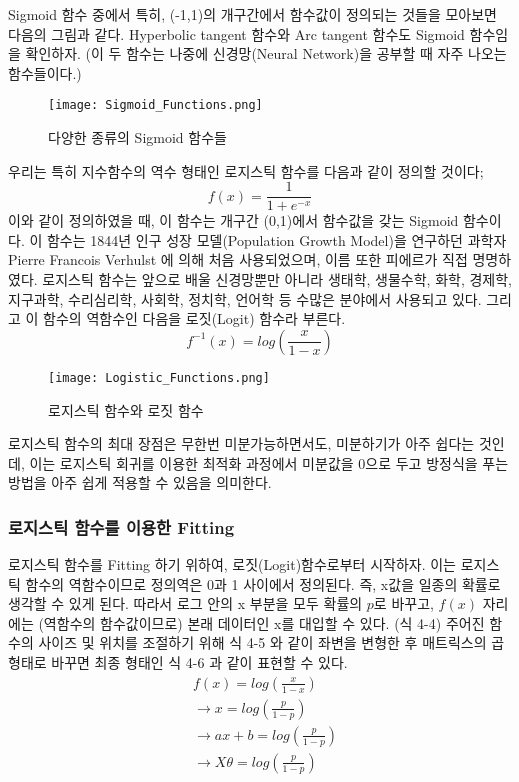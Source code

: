\documentclass[a4paper]{oblivoir}
\begin{document}
\indent Sigmoid 함수 중에서 특히, (-1,1)의 개구간에서 함수값이 정의되는 것들을 모아보면 다음의 그림과 같다. Hyperbolic tangent 함수와 Arc tangent 함수도 Sigmoid 함수임을 확인하자. (이 두 함수는 나중에 신경망(Neural Network)을 공부할 때 자주 나오는 함수들이다.)
\begin{figure}[ht]
\centering
\texttt{[image: Sigmoid\_Functions.png]}
\caption{다양한 종류의 Sigmoid 함수들}
\label{Figure 4-6}
\end{figure}

\indent 우리는 특히 지수함수의 역수 형태인 로지스틱 함수를 다음과 같이 정의할 것이다;
\begin{equation*}f(x) = \frac{1}{1+e^{-x}} \tag{4-1}\end{equation*} 이와 같이 정의하였을 때, 이 함수는 개구간 (0,1)에서 함수값을 갖는 Sigmoid 함수이다. 이 함수는 1844년 인구 성장 모델(Population Growth Model)을 연구하던 과학자 Pierre Francois Verhulst 에 의해 처음 사용되었으며, 이름 또한 피에르가 직접 명명하였다.  로지스틱 함수는 앞으로 배울 신경망뿐만 아니라 생태학, 생물수학, 화학, 경제학, 지구과학, 수리심리학, 사회학, 정치학, 언어학 등 수많은 분야에서 사용되고 있다. 그리고 이 함수의 역함수인 다음을 로짓(Logit) 함수라 부른다. \begin{equation*}f^{-1}(x) = log(\frac{x}{1-x}) \tag{4-2}\end{equation*}
\begin{figure}[ht]
\centering
\texttt{[image: Logistic\_Functions.png]}
\caption{로지스틱 함수와 로짓 함수}
\label{Figure 4-7}
\end{figure}

\indent 로지스틱 함수의 최대 장점은 무한번 미분가능하면서도, 미분하기가 아주 쉽다는 것인데,  이는 로지스틱 회귀를 이용한 최적화 과정에서 미분값을 0으로 두고 방정식을 푸는 방법을 아주 쉽게 적용할 수 있음을 의미한다. 

\subsubsection{로지스틱 함수를 이용한 Fitting}
로지스틱 함수를 Fitting 하기 위하여, 로짓(Logit)함수로부터 시작하자. 이는 로지스틱 함수의 역함수이므로 정의역은 0과 1 사이에서 정의된다. 즉, x값을 일종의 확률로 생각할 수 있게 된다. 따라서 로그 안의 x 부분을 모두 확률의 $p$로 바꾸고, $f(x)$ 자리에는 (역함수의 함수값이므로) 본래 데이터인 x를 대입할 수 있다. (식 4-4) 주어진 함수의 사이즈 및 위치를 조절하기 위해 식 4-5 와 같이 좌변을 변형한 후 매트릭스의 곱 형태로 바꾸면 최종 형태인 식 4-6 과 같이 표현할 수 있다.
\begin{align*}
&f(x) = log(\frac{x}{1-x})				\tag{4-3}\\
&\to x=log(\frac{p}{1-p}) 			\tag{4-4}\\
&\to ax+b = log(\frac{p}{1-p})		\tag{4-5}\\
&\to X\theta = log(\frac{p}{1-p})		\tag{4-6}
\end{align*}
\end{document}
